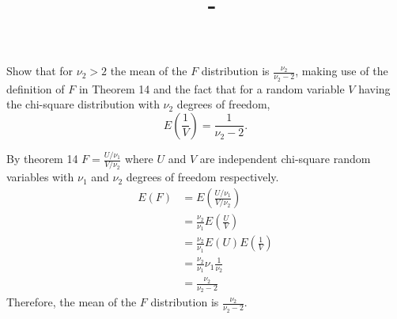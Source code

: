 \documentclass[answers,12pt,addpoints]{exam}
\author{\name}
\title{\course \ - \assignment}
\begin{document}
\maketitle

\begin{questions}
    Show that for \(\nu_2 > 2\) the mean of the \(F\) distribution is \(\frac{\nu_2}{\nu_2 - 2}\), making use of the definition of \(F\) in Theorem 14 and the fact that for a random variable \(V\) having the chi-square distribution with \(\nu_2\) degrees of freedom,
    \[ E \left( \frac{1}{V} \right) = \frac{1}{\nu_2 - 2}. \]
    \begin{solution}
        By theorem 14 $F = \frac{U/\nu_1}{V/\nu_2}$ where \(U\) and \(V\) are independent chi-square random variables with \(\nu_1\) and \(\nu_2\) degrees of freedom respectively. 
        \begin{align*}
            E(F) &= E \left( \frac{U/\nu_1}{V/\nu_2} \right) \\
            &= \frac{\nu_2}{\nu_1} E \left( \frac{U}{V} \right) \\
            &= \frac{\nu_2}{\nu_1} E(U) E \left( \frac{1}{V} \right) \\
            &= \frac{\nu_2}{\nu_1} \nu_1 \frac{1}{\nu_2} \\
            &= \frac{\nu_2}{\nu_2 - 2}
        \end{align*}
        Therefore, the mean of the \(F\) distribution is \(\frac{\nu_2}{\nu_2 - 2}\).
    \end{solution}


\end{questions}
\end{document}
